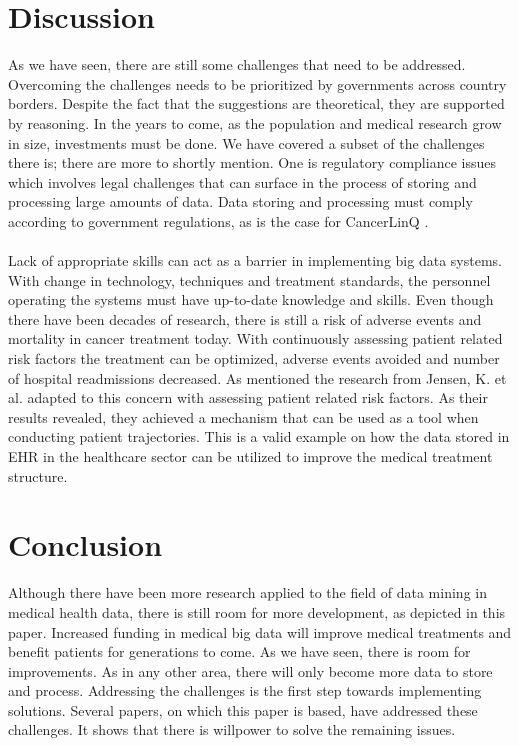 \section{Discussion}
As we have seen, there are still some challenges that need to be addressed. Overcoming the challenges needs to be prioritized by governments across country borders. Despite the fact that the suggestions are theoretical, they are supported by reasoning. In the years to come, as the population and medical research grow in size, investments must be done. We have covered a subset of the challenges there is; there are more to shortly mention. One is regulatory compliance issues\cite{kek} which involves legal challenges that can surface in the process of storing and processing large amounts of data. Data storing and processing must comply according to government regulations, as is the case for CancerLinQ \cite{gouvernment}.
\\\\
Lack of appropriate skills can act as a barrier in implementing big data systems\cite{kek}. With change in technology, techniques and treatment standards, the personnel operating the systems must have up-to-date knowledge and skills.
Even though there have been decades of research, there is still a risk of adverse events and mortality in cancer treatment today. With continuously assessing patient related risk factors the treatment can be optimized, adverse events avoided and number of hospital readmissions decreased. As mentioned the research  from Jensen, K. et al. adapted to this concern with assessing patient related risk factors. As their results revealed, they achieved a mechanism that can be used as a tool when conducting patient trajectories. This is a valid example on how the data stored in EHR in the healthcare sector can be utilized to improve the medical treatment structure. 

 
\section{Conclusion}
Although there have been more research applied to the field of data mining in medical health data, there is still room for more development, as depicted in this paper. Increased funding in medical big data will improve medical treatments and benefit patients for generations to come. As we have seen, there is room for improvements. As in any other area, there will only become more data to store and process. Addressing the challenges is the first step towards implementing solutions. Several papers, on which this paper is based, have addressed these challenges. It shows that there is willpower to solve the remaining issues. 











